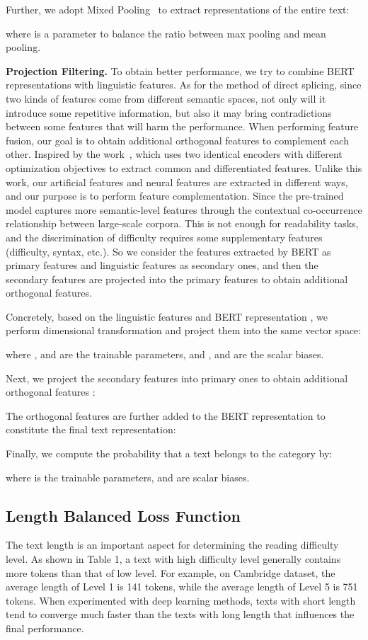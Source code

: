 \documentclass[11pt]{article}
\begin{document}
Further, we adopt Mixed Pooling~\cite{yu2014mixed} to extract representations of the entire text:


where  is a parameter 
to balance the ratio between max pooling and mean pooling.


\noindent\textbf{Projection Filtering.} To obtain better performance, we try to combine BERT representations with linguistic features. As for the method of direct splicing, since two kinds of features come from different semantic spaces, not only will it introduce some repetitive information, 
but also it may bring contradictions between some features that will harm the performance. 
When performing feature fusion, our goal is to obtain additional orthogonal features to complement each other.
Inspired by the work~\cite{qin2020feature}, which uses two identical encoders with different optimization objectives to extract common and differentiated features.
Unlike this work, our artificial features and neural features are extracted in different ways, and our purpose is to perform feature complementation.
Since the pre-trained model captures more semantic-level features through the contextual co-occurrence relationship between large-scale corpora. This is not enough for readability tasks, and the discrimination of difficulty requires some supplementary features (difficulty, syntax, etc.).
So we consider the features extracted by BERT as primary features and linguistic features as secondary ones, and then the secondary features are projected into the primary features to obtain additional orthogonal features.

Concretely, based on the linguistic features  and BERT representation , we perform dimensional transformation and project them into the same vector space:



where ,  and  are the trainable parameters, and ,  and  are the scalar biases. 

Next, we project the secondary features into primary ones to obtain additional orthogonal features :




The orthogonal features are further added to the BERT representation to constitute the final text representation:


Finally, we compute the probability that a text belongs to the  category by:

where  is the trainable parameters, and  are scalar biases.


\subsection{Length Balanced Loss Function}
The text length is an important aspect for determining the reading difficulty level. As shown in Table 1, a text with high difficulty level generally contains more tokens than that of low level. For example, on Cambridge dataset, the average length of Level 1 is 141 tokens, while the average length of Level 5 is 751 tokens.
When experimented with deep learning methods, texts with short length tend to converge much faster than the texts with long length that influences the final performance. 
\end{document}
